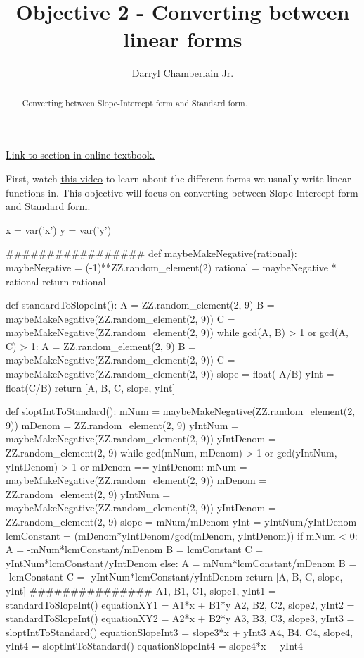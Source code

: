 \documentclass{ximera}
\author{Darryl Chamberlain Jr.}
\title{Objective 2 - Converting between linear forms}
\begin{document}
\begin{abstract}
Converting between Slope-Intercept form and Standard form.
\end{abstract}
\maketitle

\href{https://cnx.org/contents/mwjClAV_@8.1:62_eXnY6@14/Linear-Equations-in-One-Variable}{Link to section in online textbook.}


First, watch \underline{\href{https://mediasite.video.ufl.edu/Mediasite/Play/49d31e3bbea64e158f4481960444eb791d}{this video}} to learn about the different forms we usually write linear functions in. This objective will focus on converting between Slope-Intercept form and Standard form.

\begin{sagesilent}
x = var('x')
y = var('y')

#################
def maybeMakeNegative(rational):
    maybeNegative = (-1)**ZZ.random_element(2)
    rational = maybeNegative * rational
    return rational

def standardToSlopeInt():
    A = ZZ.random_element(2, 9)
    B = maybeMakeNegative(ZZ.random_element(2, 9))
    C = maybeMakeNegative(ZZ.random_element(2, 9))
    while gcd(A, B) > 1 or gcd(A, C) > 1:
        A = ZZ.random_element(2, 9)
        B = maybeMakeNegative(ZZ.random_element(2, 9))
        C = maybeMakeNegative(ZZ.random_element(2, 9))
    slope = float(-A/B)
    yInt = float(C/B)
    return [A, B, C, slope, yInt]

def sloptIntToStandard():
    mNum = maybeMakeNegative(ZZ.random_element(2, 9))
    mDenom = ZZ.random_element(2, 9)
    yIntNum = maybeMakeNegative(ZZ.random_element(2, 9))
    yIntDenom = ZZ.random_element(2, 9)
    while gcd(mNum, mDenom) > 1 or gcd(yIntNum, yIntDenom) > 1 or mDenom == yIntDenom:
        mNum = maybeMakeNegative(ZZ.random_element(2, 9))
        mDenom = ZZ.random_element(2, 9)
        yIntNum = maybeMakeNegative(ZZ.random_element(2, 9))
        yIntDenom = ZZ.random_element(2, 9)
    slope = mNum/mDenom
    yInt = yIntNum/yIntDenom
    lcmConstant = (mDenom*yIntDenom/gcd(mDenom, yIntDenom))
    if mNum < 0:
        A = -mNum*lcmConstant/mDenom
        B = lcmConstant
        C = yIntNum*lcmConstant/yIntDenom
    else:
        A = mNum*lcmConstant/mDenom
        B = -lcmConstant
        C = -yIntNum*lcmConstant/yIntDenom
    return [A, B, C, slope, yInt]
###############
A1, B1, C1, slope1, yInt1 = standardToSlopeInt()
equationXY1 = A1*x + B1*y
A2, B2, C2, slope2, yInt2 = standardToSlopeInt()
equationXY2 = A2*x + B2*y
A3, B3, C3, slope3, yInt3 = sloptIntToStandard()
equationSlopeInt3 = slope3*x + yInt3
A4, B4, C4, slope4, yInt4 = sloptIntToStandard()
equationSlopeInt4 = slope4*x + yInt4
\end{sagesilent}
\end{document}
